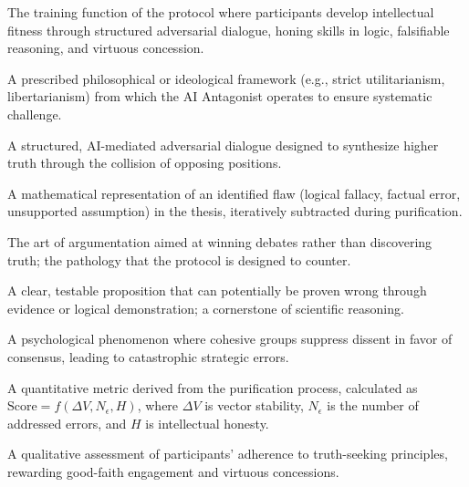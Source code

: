 \documentclass[11pt,a4paper]{article}
\begin{document}
\begin{description}[style=nextline, leftmargin=0pt, labelindent=0pt, font=\normalfont\bfseries]
    \item[Cognitive Gymnasium] The training function of the protocol where participants develop intellectual fitness through structured adversarial dialogue, honing skills in logic, falsifiable reasoning, and virtuous concession.
    
    \item[Cognitive Setting] A prescribed philosophical or ideological framework (e.g., strict utilitarianism, libertarianism) from which the AI Antagonist operates to ensure systematic challenge.
    
    \item[Epistemological Boxing] A structured, AI-mediated adversarial dialogue designed to synthesize higher truth through the collision of opposing positions.
    
    \item[Error Vector ($\vec{\epsilon}_j$)] A mathematical representation of an identified flaw (logical fallacy, factual error, unsupported assumption) in the thesis, iteratively subtracted during purification.
    
    \item[Eristics] The art of argumentation aimed at winning debates rather than discovering truth; the pathology that the protocol is designed to counter.
    
    \item[Falsifiable Thesis] A clear, testable proposition that can potentially be proven wrong through evidence or logical demonstration; a cornerstone of scientific reasoning.
    
    \item[Groupthink] A psychological phenomenon where cohesive groups suppress dissent in favor of consensus, leading to catastrophic strategic errors.
    
    \item[Integrity Score] A quantitative metric derived from the purification process, calculated as $\text{Score} = f(\Delta V, N_{\epsilon}, H)$, where $\Delta V$ is vector stability, $N_{\epsilon}$ is the number of addressed errors, and $H$ is intellectual honesty.
    
    \item[Intellectual Honesty Scorecard] A qualitative assessment of participants' adherence to truth-seeking principles, rewarding good-faith engagement and virtuous concessions.
    

\end{description}
\end{document}
